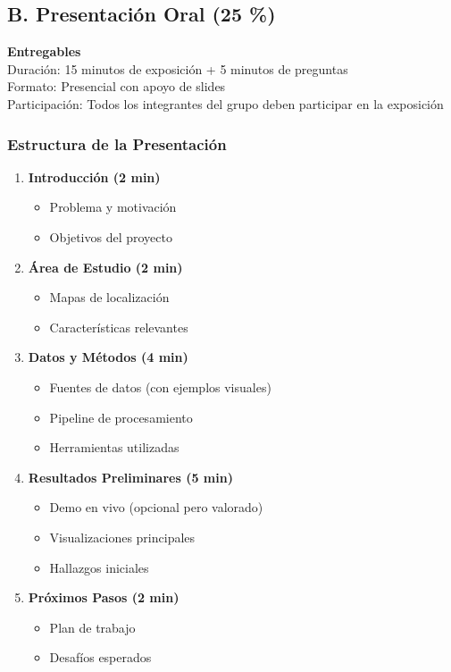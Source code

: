 \documentclass[11pt,a4paper]{article}
\begin{document}
\subsection{B. Presentación Oral (25 \%)}
\textbf{Entregables}\\
Duración: 15 minutos de exposición + 5 minutos de preguntas\\
Formato: Presencial con apoyo de slides\\
Participación: Todos los integrantes del grupo deben participar en la exposición

\subsubsection{Estructura de la Presentación}
\begin{enumerate}[leftmargin=1.2cm]
  \item \textbf{Introducción (2 min)}
  \begin{itemize}[leftmargin=1.2cm]
    \item Problema y motivación
    \item Objetivos del proyecto
  \end{itemize}

  \item \textbf{Área de Estudio (2 min)}
  \begin{itemize}[leftmargin=1.2cm]
    \item Mapas de localización
    \item Características relevantes
  \end{itemize}

  \item \textbf{Datos y Métodos (4 min)}
  \begin{itemize}[leftmargin=1.2cm]
    \item Fuentes de datos (con ejemplos visuales)
    \item Pipeline de procesamiento
    \item Herramientas utilizadas
  \end{itemize}

  \item \textbf{Resultados Preliminares (5 min)}
  \begin{itemize}[leftmargin=1.2cm]
    \item Demo en vivo (opcional pero valorado)
    \item Visualizaciones principales
    \item Hallazgos iniciales
  \end{itemize}

  \item \textbf{Próximos Pasos (2 min)}
  \begin{itemize}[leftmargin=1.2cm]
    \item Plan de trabajo
    \item Desafíos esperados
  \end{itemize}
\end{enumerate}
\end{document}
